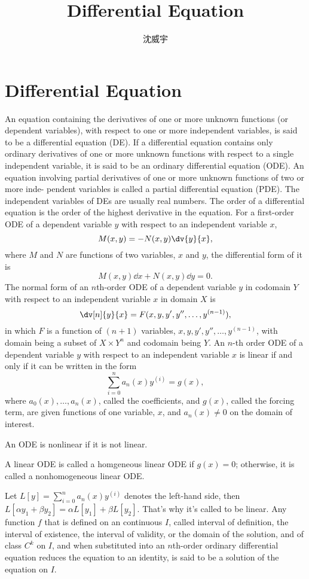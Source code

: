 \documentclass[a4paper,12pt]{report}
\begin{document}
\title{Differential Equation}
\author{沈威宇}
\date{\temtoday}
\titletocdoc
\chapter{Differential Equation}
An equation containing the derivatives of one or more unknown functions (or
dependent variables), with respect to one or more independent variables, is
said to be a differential equation (DE).
If a differential equation contains only ordinary
derivatives of one or more unknown functions with respect to a single independent
variable, it is said to be an ordinary differential equation (ODE). An equation
involving partial derivatives of one or more unknown functions of two or more inde-
pendent variables is called a partial differential equation (PDE). The independent variables of DEs are usually real numbers.
The order of a differential equation is the order of the highest derivative in the equation.
For a first-order ODE of a dependent variable $y$ with respect to an independent variable $x$,
\[M(x,y)=-N(x,y)\dv{y}{x},\]
where $M$ and $N$ are functions of two variables, $x$ and $y$, the differential form of it is
\[M(x,y)\dd{x}+N(x,y)\dd{y}=0.\]
The normal form of an $n$th-order ODE of a dependent variable $y$ in codomain $Y$ with respect to an independent variable $x$ in domain $X$ is
\[\dv[n]{y}{x}=F(x,y,y',y'',\ldots,y^{(n-1)}),\]
in which $F$ is a function of $(n+1)$ variables, $x,y,y',y'',\ldots,y^{(n-1)}$, with domain being a subset of $X\times Y^n$ and codomain being $Y$.
An $n$-th order ODE of a dependent variable $y$ with respect to an independent variable $x$ is linear if and only if it can be written in the form
\[\sum_{i=0}^na_n(x)y^{(i)}=g(x),\]
where $a_0(x),\ldots,a_n(x)$, called the coefficients, and $g(x)$, called the forcing term, are given functions of one variable, $x$, and $a_n(x)\neq 0$ on the domain of interest.

An ODE is nonlinear if it is not linear.

A linear ODE is called a homgeneous linear ODE if $g(x)=0$; otherwise, it is called a nonhomogeneous linear ODE.

Let $L[y]=\sum_{i=0}^na_n(x)y^{(i)}$ denotes the left-hand side, then $L[\alpha y_1+\beta y_2]=\alpha L[y_1]+\beta L[y_2]$. That's why it's called to be linear.
Any function $f$ that is defined on an continuous $I$, called interval of definition, the interval of existence, the interval of validity, or the domain of the solution, and of class $C^k$ on $I$, and when substituted into an $n$th-order ordinary differential equation reduces the equation to an identity, is said to be a solution of the equation on $I$.
\end{document}
